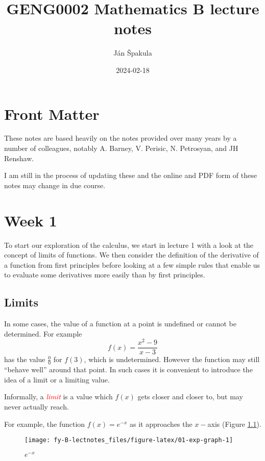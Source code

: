 \documentclass[
  11pt,
  oneside]{book}
\title{GENG0002 Mathematics B lecture notes}
\author{Ján Špakula}
\date{2024-02-18}
\newcommand{\slide}{}
\theoremstyle{definition}
\theoremstyle{definition}
\theoremstyle{definition}
\theoremstyle{definition}
\theoremstyle{remark}
\begin{document}
\maketitle

{
\setcounter{tocdepth}{1}
\tableofcontents
}
\chapter*{Front Matter}\label{front-matter}

These notes are based heavily on the notes provided over many years by a number of colleagues, notably A. Barney, V. Perisic, N. Petrosyan, and JH Renshaw.

I am still in the process of updating these and the online and PDF form of these notes may change in due course.

\chapter{Week 1}\label{week-one}

To start our exploration of the calculus, we start in lecture 1 with a look at the concept of limits of functions. We then consider the definition of the derivative of a function from first principles before looking at a few simple rules that enable us to evaluate some derivatives more easily than by first principles.
\slide

\section{Limits}\label{lecture-one}

In some cases, the value of a function at a point is undefined or cannot be determined. For example
\[
f(x) = \frac{x^2-9}{x-3}\tag{1}
\]
has the value \(\frac00\) for \(f(3)\), which is undetermined. However the function may still ``behave well'' around that point. In such cases it is convenient to introduce the idea of a limit or a limiting value.

Informally, a \textcolor{red}{\em limit} is a value which \(f(x)\) gets closer and closer to, but may never actually reach.

\slide

For example, the function \(f(x) = e^{-x}\) as it approaches the \(x-\)axis (Figure \ref{fig:01-exp-graph}).

\begin{figure}

{\centering \texttt{[image: fy-B-lectnotes\_files/figure-latex/01-exp-graph-1]} 

}

\caption{$e^{-x}$}\label{fig:01-exp-graph}
\end{figure}
\end{document}
